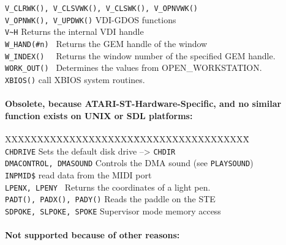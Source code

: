 \begin{tabbing}
\verb|V_CLRWK(), V_CLSVWK(), V_CLSWK(), V_OPNVWK()|	\\
\verb|V_OPNWK(), V_UPDWK()|\> VDI-GDOS functions\\
\verb|V~H|\>	       	Returns the internal VDI handle\\
\verb|W_HAND(#n) |\>    	Returns the GEM handle of the window\\
\verb|W_INDEX()  |\>    	Returns the window number of the specified GEM handle.\\
\verb|WORK_OUT() |\>    	Determines the values from OPEN\_WORKSTATION.\\
\verb|XBIOS()|\>	       	call XBIOS system routines.\\

\end{tabbing}

\paragraph{Obsolete, because ATARI-ST-Hardware-Specific, and no similar function
exists on UNIX or SDL platforms:}

\begin{tabbing}
XXXXXXXXXXXXXXXXXXXX\=XXXXXXXXXXXXXXXXXX\=\kill\\
\verb|CHDRIVE|\>	Sets the default disk drive --> \verb|CHDIR|\\
\verb|DMACONTROL, DMASOUND|\>     Controls the DMA sound (see \verb|PLAYSOUND|)\\
\verb|INPMID$|\>        	read data from the MIDI port\\
\verb|LPENX, LPENY |\>   Returns the coordinates of a light pen.\\
\verb|PADT(), PADX(), PADY()|\> Reads the paddle on the STE\\
\verb|SDPOKE, SLPOKE, SPOKE|\>  Supervisor mode memory access\\

\end{tabbing}

\paragraph{Not supported because of other reasons:}

